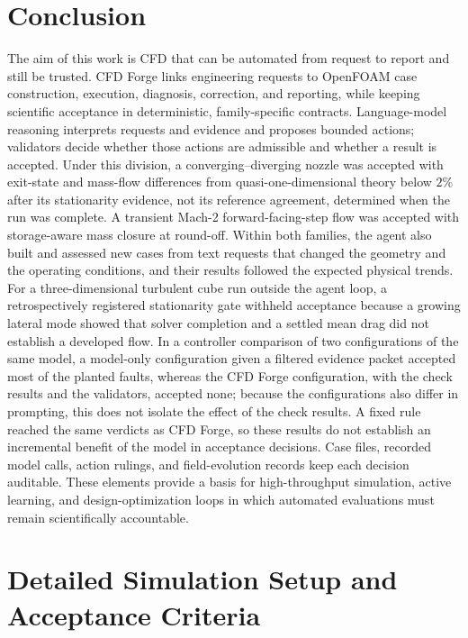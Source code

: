 \documentclass[11pt]{article}
\begin{document}
\section{Conclusion}
\label{sec:conclusion}

The aim of this work is CFD that can be automated from request to report and
still be trusted. CFD Forge links engineering requests to OpenFOAM case construction,
execution, diagnosis, correction, and reporting, while keeping scientific
acceptance in deterministic, family-specific contracts. Language-model
reasoning interprets requests and evidence and proposes bounded actions;
validators decide whether those actions are admissible and whether a result
is accepted. Under this division, a converging--diverging nozzle was accepted
with exit-state and mass-flow differences from quasi-one-dimensional theory
below $2\%$ after its
stationarity evidence, not its reference agreement, determined when the run
was complete. A transient Mach-2 forward-facing-step flow was accepted with
storage-aware mass closure at round-off. Within both families, the agent also built and
assessed new cases from text requests that changed the geometry and the
operating conditions, and their results followed the expected physical
trends. For a three-dimensional turbulent cube run outside the agent loop, a
retrospectively registered stationarity gate withheld acceptance because a
growing lateral mode showed that solver completion and a settled mean drag
did not establish a developed flow. In a controller comparison of two configurations of the same model, a
model-only configuration given a filtered evidence packet accepted most of the
planted faults, whereas the CFD Forge configuration, with the check results
and the validators, accepted none; because the configurations also differ in
prompting, this does not isolate the effect of the check results. A fixed rule
reached the same verdicts as CFD Forge, so these results do not establish an
incremental benefit of the model in acceptance decisions. Case files,
recorded model calls, action rulings, and field-evolution records keep each
decision auditable. These elements provide a basis for high-throughput simulation,
active learning, and design-optimization loops in which automated
evaluations must remain scientifically accountable.

\appendix
\section{Detailed Simulation Setup and Acceptance Criteria}
\label{app:setup}
\end{document}

